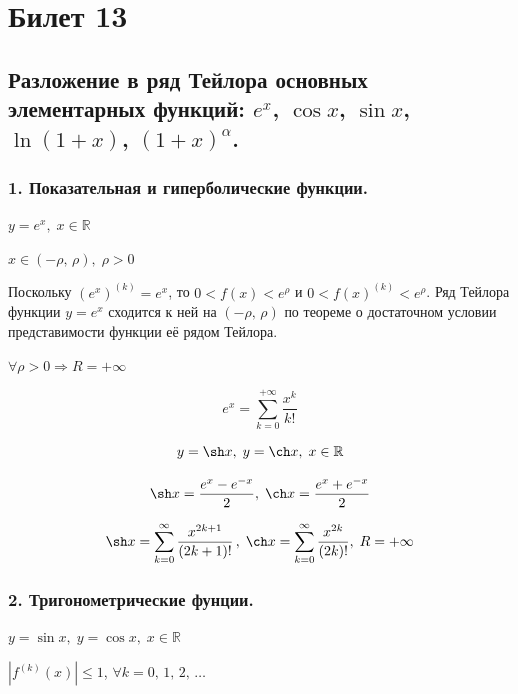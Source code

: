 \documentclass[a4paper,12pt]{article} %
\newcommand{\ryad}{\sum\limits^{\infty}_{k = 0}}
\begin{document}


\section{Билет 13}
\subsection{Разложение в ряд Тейлора основных элементарных функций: $e^x$, $\cos x$, $\sin x$, $\ln (1 + x)$, $(1 + x)^{\alpha}$.}


\subsubsection*{1. Показательная и гиперболические функции.}


\begin{center}
$y = e^x, \; x \in \mathbb{R}$
\vspace{8pt}

$x \in (-\rho, \, \rho), \; \rho > 0$
\end{center}

Поскольку $(e^x)^{(k)} = e^x $, то $0 < f(x) < e^{\rho}$ и $0 < f(x)^{(k)} < e^{\rho}$. Ряд Тейлора функции $y = e^x$ сходится к ней на $( - \rho, \, \rho)$ по теореме о достаточном условии представимости функции её рядом Тейлора.

$\forall \rho > 0 \Rightarrow R = + \infty$

\[ e^x = \sum\limits^{+\infty}_{k = 0} \frac{x^k}{k!}\]

\[y = \sh x, \; y = \ch x, \; x \in \mathbb{R} \]

\[ \sh x = \frac{e^x - e^{-x}}{2}, \; \ch x = \frac{e^x + e^{-x}}{2} \]

\[ \sh x = \ryad \frac{x^{2k + 1}}{(2k + 1)!} \,, \; \ch x = \ryad \frac{x^{2k}}{(2k)!}, \; R = +\infty\]


\subsubsection*{2. Тригонометрические фунции.}

\begin{center}
$y = \sin x, \; y = \cos x, \; x \in \mathbb{R}$
\vspace{8pt}

$| f^{(k)} (x) | \le 1$, $\forall k = 0, \, 1, \, 2, \, \ldots$
\end{center}
 
\end{document}
